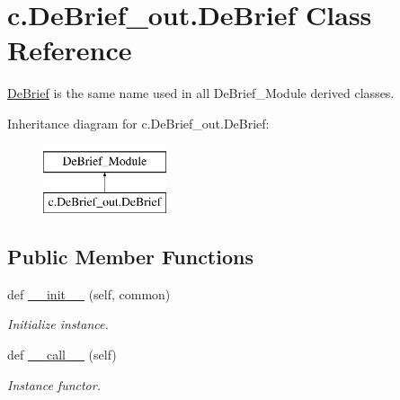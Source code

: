 \hypertarget{classc_1_1_de_brief__out_1_1_de_brief}{}\section{c.\+De\+Brief\+\_\+out.\+De\+Brief Class Reference}
\label{classc_1_1_de_brief__out_1_1_de_brief}


\hyperlink{classc_1_1_de_brief__out_1_1_de_brief}{De\+Brief} is the same name used in all De\+Brief\+\_\+\+Module derived classes.  


Inheritance diagram for c.\+De\+Brief\+\_\+out.\+De\+Brief\+:\begin{figure}[H]
\begin{center}
\leavevmode
\includegraphics[height=2.000000cm]{classc_1_1_de_brief__out_1_1_de_brief}
\end{center}
\end{figure}
\subsection*{Public Member Functions}
\begin{DoxyCompactItemize}
\item 
\hypertarget{classc_1_1_de_brief__out_1_1_de_brief_a0e47ac928b86e95578ca517e7312e82f}{}def \hyperlink{classc_1_1_de_brief__out_1_1_de_brief_a0e47ac928b86e95578ca517e7312e82f}{\+\_\+\+\_\+init\+\_\+\+\_\+} (self, common)\label{classc_1_1_de_brief__out_1_1_de_brief_a0e47ac928b86e95578ca517e7312e82f}

\begin{DoxyCompactList}\small\item\em Initialize instance. \end{DoxyCompactList}\item 
\hypertarget{classc_1_1_de_brief__out_1_1_de_brief_af7e0a40efdc12421eb8e64f80d26f8a7}{}def \hyperlink{classc_1_1_de_brief__out_1_1_de_brief_af7e0a40efdc12421eb8e64f80d26f8a7}{\+\_\+\+\_\+call\+\_\+\+\_\+} (self)\label{classc_1_1_de_brief__out_1_1_de_brief_af7e0a40efdc12421eb8e64f80d26f8a7}

\begin{DoxyCompactList}\small\item\em Instance functor. \end{DoxyCompactList}\end{DoxyCompactItemize}


